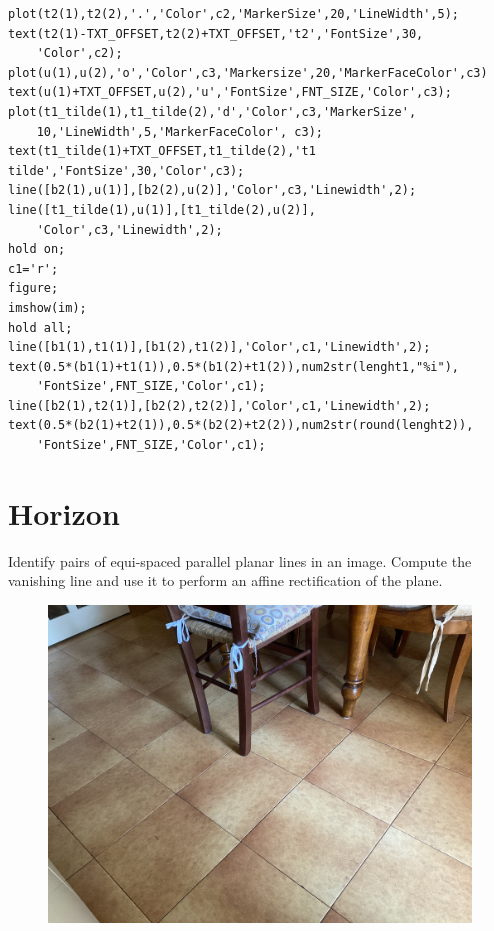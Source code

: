 \documentclass[12pt, a4paper]{report}
\begin{document}
\begin{lstlisting}[style=Matlab]
plot(t2(1),t2(2),'.','Color',c2,'MarkerSize',20,'LineWidth',5);
text(t2(1)-TXT_OFFSET,t2(2)+TXT_OFFSET,'t2','FontSize',30,
    'Color',c2);
plot(u(1),u(2),'o','Color',c3,'Markersize',20,'MarkerFaceColor',c3)
text(u(1)+TXT_OFFSET,u(2),'u','FontSize',FNT_SIZE,'Color',c3);
plot(t1_tilde(1),t1_tilde(2),'d','Color',c3,'MarkerSize',
    10,'LineWidth',5,'MarkerFaceColor', c3);
text(t1_tilde(1)+TXT_OFFSET,t1_tilde(2),'t1 tilde','FontSize',30,'Color',c3);
line([b2(1),u(1)],[b2(2),u(2)],'Color',c3,'Linewidth',2);
line([t1_tilde(1),u(1)],[t1_tilde(2),u(2)],
    'Color',c3,'Linewidth',2);
hold on;
c1='r';
figure;
imshow(im);
hold all;
line([b1(1),t1(1)],[b1(2),t1(2)],'Color',c1,'Linewidth',2);
text(0.5*(b1(1)+t1(1)),0.5*(b1(2)+t1(2)),num2str(lenght1,"%i"),
    'FontSize',FNT_SIZE,'Color',c1);
line([b2(1),t2(1)],[b2(2),t2(2)],'Color',c1,'Linewidth',2);
text(0.5*(b2(1)+t2(1)),0.5*(b2(2)+t2(2)),num2str(round(lenght2)),
    'FontSize',FNT_SIZE,'Color',c1);
        \end{lstlisting} 

        \newpage 
    
        \section{Horizon}
        Identify pairs of equi-spaced parallel planar lines in an image. Compute the vanishing line and use it to perform an affine rectification of the plane.
        \begin{figure}[H]
            \centering
            \includegraphics[width=0.75\linewidth]{images/floor.png}
        \end{figure}
\end{document}
